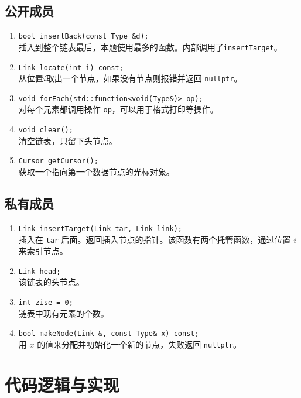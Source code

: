 {
\subsection{公开成员}
\begin{enumerate}
    \item \lstinline{bool insertBack(const Type &d);}\\
          插入到整个链表最后，本题使用最多的函数。内部调用了\lstinline{insertTarget}。
    \item \lstinline{Link locate(int i) const;} \\
          从位置$i$取出一个节点，如果没有节点则报错并返回 \lstinline{nullptr}。
    \item \lstinline{void forEach(std::function<void(Type&)> op);} \\
          对每个元素都调用操作 \lstinline{op}，可以用于格式打印等操作。
    \item \lstinline{void clear();} \\
          清空链表，只留下头节点。
    \item \lstinline{Cursor getCursor();} \\
	  获取一个指向第一个数据节点的光标对象。
\end{enumerate}

\subsection{私有成员}
\begin{enumerate}
    \item \lstinline{Link insertTarget(Link tar, Link link);}\\
          插入在 \lstinline{tar} 后面。返回插入节点的指针。该函数有两个托管函数，通过位置 $i$ 来索引节点。
    \item \lstinline{Link head;} \\
          该链表的头节点。
    \item \lstinline{int zise = 0;} \\
          链表中现有元素的个数。
    \item \lstinline{bool makeNode(Link &, const Type& x) const;} \\
          用 $x$ 的值来分配并初始化一个新的节点，失败返回 \lstinline{nullptr}。
\end{enumerate}
}

\section{代码逻辑与实现}

